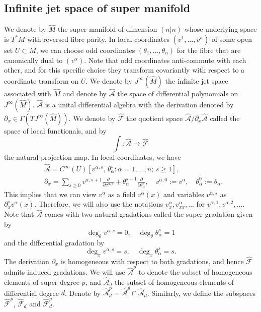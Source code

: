 \documentclass[11pt,a4paper]{amsart}
\numberwithin{equation}{section}
\newcommand{\diff}[2]{\frac{\partial #1}{\partial #2}}
\newcommand{\qa}{\alpha}
\newcommand{\qth}{\theta}
\newcommand{\qp}{\partial}
\newcommand{\Qg}{\Gamma}
\newcommand{\jja}{\mathcal{\hat A}}
\newcommand{\jjf}{\mathcal{\hat F}}
\numberwithin{equation}{section}
\begin{document}
\subsection{Infinite jet space of super manifold}
We denote by $\hat M$ the super manifold of dimension $(n|n)$ whose underlying space is $T^*M$ with reversed fibre parity. In local coordinates $(v^1,\dots, v^n)$ of some open set $U\subset M$, we can choose odd coordinates $(\qth_1,\dots,\qth_n)$ for the fibre that are canonically dual to $(v^\qa)$. Note that odd coordinates anti-commute with each other, and for this specific choice they transform covariantly with respect to a coordinate transform on $U$. We denote by $J^\infty(\hat M)$ the infinite jet space associated with $\hat M$ and denote by $\mathcal{\hat A}$ the space of differential polynomials on $J^\infty(\hat M)$. $\mathcal{\hat A}$ is a unital differential algebra with the derivation denoted by $\qp_x\in\Qg(TJ^\infty(\hat M))$. We denote by $\jjf$ the quotient space $\jja/\qp_x\jja$ called the space of local functionals, and by 
\[
\int\colon\jja\to\jjf
\]
the natural projection map. In local coordinates, we have 
\begin{align*}
&\jja = C^\infty(U)\left[v^{\qa,s},\,\qth^s_{\qa}\colon \qa = 1,...,n;\, s\geq 1\right],\\ 
&\qp_x = \sum_{s\geq 0}v^{\qa,s+1}\diff{}{v^{\qa,s}}+\qth_\qa^{s+1}\diff{}{\qth_\qa^s},\quad v^{\qa,0}:=v^\qa,\quad \qth_\qa^0:=\qth_\qa.
\end{align*}
This implies that we can view $v^\qa$ as  a field $v^\qa(x)$ and variables $v^{\qa,s}$ as $\qp_x^s v^\qa(x)$. Therefore, we will also use the notations $v^\qa_x,v^\qa_{xx},\dots$ for $v^{\qa,1},v^{\qa,2},\dots$.
Note that $\jja$ comes with two natural gradations called the super gradation given by 
\[
\deg_\qth v^{\qa,s} = 0,\quad \deg_\qth \qth_\qa^s = 1
\]
and the differential gradation by 
\[
\deg_x v^{\qa,s} = s,\quad \deg_x \qth_\qa^s = s.
\]
The derivation $\qp_x$ is homogeneous with respect to both gradations, and hence $\jjf$ admits induced gradations. We will use $\jja^p$ to denote the subset of homogeneous elements of super degree $p$, and $\jja_d$ the subset of homogeneous elements of differential degree $d$. Denote by $\jja^p_d = \jja^p\cap\jja_d$. Similarly, we define the subspaces $\jjf^p$, $\jjf_d$ and  $\jjf^p_d$.
  
\end{document}
